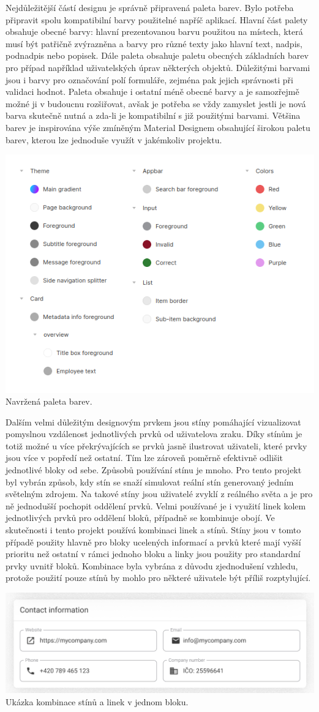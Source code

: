 \begin{itemize}
\begin{itemize}
		Nejdůležitější částí designu je správně připravená paleta barev.
		Bylo potřeba připravit spolu kompatibilní barvy použitelné napříč aplikací.
		Hlavní část palety obsahuje obecné barvy: hlavní prezentovanou barvu použitou na místech, která musí být
		patřičně zvýrazněna a barvy pro různé texty jako hlavní text, nadpis, podnadpis nebo popisek.
		Dále paleta obsahuje paletu obecných základních barev pro případ například uživatelských úprav některých objektů.
		Důležitými barvami jsou i barvy pro označování polí formuláře, zejména pak jejich správnosti při validaci
		hodnot.
		Paleta obsahuje i ostatní méně obecné barvy a je samozřejmě možné ji v budoucnu rozšiřovat, avšak je potřeba se
		vždy zamyslet jestli je nová barva skutečně nutná a zda-li je kompatibilní s již použitými barvami.
		Většina barev je inspirována výše zmíněným Material Designem obsahující širokou paletu barev, kterou lze jednoduše
		využít v jakémkoliv projektu.

		\includegraphics[width=0.24\linewidth]{obrazky/paleta_barev.png}\hfill
		Navržená paleta barev. %

		Dalším velmi důležitým designovým prvkem jsou stíny pomáhající vizualizovat pomyslnou vzdálenost jednotlivých
		prvků od uživatelova zraku.
		Díky stínům je totiž možné u více překrývajících se prvků jasně ilustrovat uživateli, které prvky jsou více v
		popředí než ostatní.
		Tím lze zároveň poměrně efektivně odlišit jednotlivé bloky od sebe.
		Způsobů používání stínu je mnoho.
		Pro tento projekt byl vybrán způsob, kdy stín se snaží simulovat reální stín generovaný jedním světelným zdrojem.
		Na takové stíny jsou uživatelé zvyklí z reálného světa a je pro ně jednodušší pochopit oddělení prvků.
		Velmi používané je i využití linek kolem jednotlivých prvků pro oddělení bloků, případně se kombinuje obojí.
		Ve skutečnosti i tento projekt používá kombinaci linek a stínů.
		Stíny jsou v tomto případě použity hlavně pro bloky ucelených informací a prvků které mají vyšší prioritu než
		ostatní v rámci jednoho bloku a linky jsou použity pro standardní prvky uvnitř bloků.
		Kombinace byla vybrána z důvodu zjednodušení vzhledu, protože použití pouze stínů by mohlo pro některé uživatele
		být příliš rozptylující.

		\includegraphics[width=0.24\linewidth]{obrazky/ukazka_stinu_a_linek}\hfill
		Ukázka kombinace stínů a linek v jednom bloku. %


\end{itemize}
\end{itemize}
